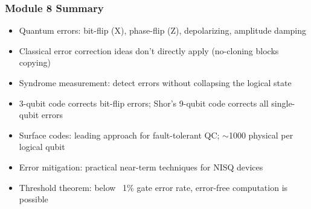 \begin{frame}[fragile]\frametitle{Module 8 Summary}
\begin{itemize}
\item Quantum errors: bit-flip (X), phase-flip (Z), depolarizing, amplitude damping
\item Classical error correction ideas don't directly apply (no-cloning blocks copying)
\item Syndrome measurement: detect errors without collapsing the logical state
\item 3-qubit code corrects bit-flip errors; Shor's 9-qubit code corrects all single-qubit errors
\item Surface codes: leading approach for fault-tolerant QC; $\sim$1000 physical per logical qubit
\item Error mitigation: practical near-term techniques for NISQ devices
\item Threshold theorem: below ~1\% gate error rate, error-free computation is possible
\end{itemize}
\end{frame}
